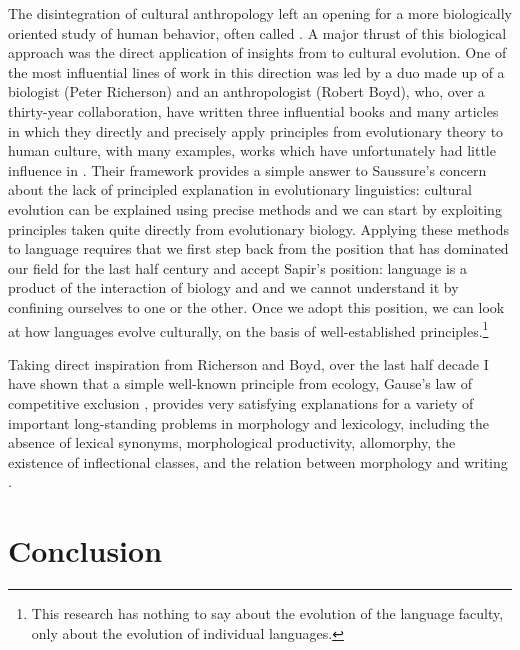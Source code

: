 \documentclass[output=paper,
modfonts
]{LSP/langsci}
\begin{document}
The disintegration of cultural anthropology left an opening for a more biologically oriented study of human behavior, often called . A major thrust of this biological approach was the direct application of insights from  to cultural evolution. One of the most influential lines of work in this direction was led by a duo made up of a biologist (Peter Richerson) and an anthropologist (Robert Boyd), who, over a thirty-year collaboration, have written three influential books \citep{boydandricherson1985,boydandricherson2005,Richersonandboyd2005} and many articles in which they directly and precisely apply principles from evolutionary theory to human culture, with many examples, works which have unfortunately had little influence in . Their framework provides a simple answer to Saussure's concern about the lack of principled explanation in evolutionary linguistics: cultural evolution can be explained using precise methods and we can start by exploiting principles taken quite directly from evolutionary biology.  Applying these methods to language requires that we first step back from the position that has dominated our field for the last half century and accept Sapir's position: language is a product of the interaction of biology and  and we cannot understand it by confining ourselves to one or the other.  Once we adopt this position, we can look at how languages evolve culturally, on the basis of well-established principles.\footnote{This research has nothing to say about the evolution of the language faculty, only about the evolution of individual languages.}

Taking direct inspiration from Richerson and Boyd, over the last half decade I have shown that a simple well-known principle from ecology, Gause's law of competitive exclusion \citep{Lotka1925,Volterra1926,Volterra1931,Gause1934}, provides very satisfying explanations for a variety of important long-standing problems in morphology and lexicology, including the absence of lexical synonyms, morphological productivity, allomorphy, the existence of inflectional classes, and the relation between morphology and writing \citep{lindsayandaronoff2013,aronoffandlindsay2015,aronoff2016,bergandaronofftoappeara}.

\section{Conclusion}
\end{document}
